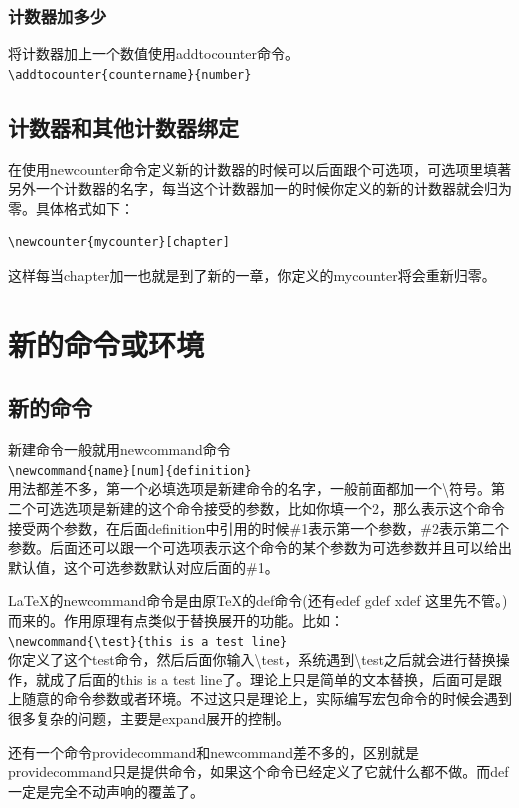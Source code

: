 \documentclass[12pt,oneside]{book}
\begin{document}
\begin{common-format}
\subsubsection{计数器加多少}
将计数器加上一个数值使用addtocounter命令。\\
\verb+\addtocounter{countername}{number}+

\subsection{计数器和其他计数器绑定}
在使用newcounter命令定义新的计数器的时候可以后面跟个可选项，可选项里填著另外一个计数器的名字，每当这个计数器加一的时候你定义的新的计数器就会归为零。具体格式如下：
\begin{Verbatim}
\newcounter{mycounter}[chapter]
\end{Verbatim}
这样每当chapter加一也就是到了新的一章，你定义的mycounter将会重新归零。





\section{新的命令或环境}
\subsection{新的命令}
新建命令一般就用newcommand命令\\
\verb+\newcommand{name}[num]{definition}+\\
用法都差不多，第一个必填选项是新建命令的名字，一般前面都加一个\textbackslash 符号。第二个可选选项是新建的这个命令接受的参数，比如你填一个2，那么表示这个命令接受两个参数，在后面definition中引用的时候\#{}1表示第一个参数，\#{}2表示第二个参数。后面还可以跟一个可选项表示这个命令的某个参数为可选参数并且可以给出默认值，这个可选参数默认对应后面的\#{}1。

\LaTeX 的newcommand命令是由原\TeX 的def命令(还有edef gdef xdef 这里先不管。)而来的。作用原理有点类似于替换展开的功能。比如：\\
\verb+\newcommand{\test}{this is a test line}+\\
你定义了这个test命令，然后后面你输入\textbackslash test，系统遇到\textbackslash test之后就会进行替换操作，就成了后面的this is a test line了。理论上只是简单的文本替换，后面可是跟上随意的命令参数或者环境。不过这只是理论上，实际编写宏包命令的时候会遇到很多复杂的问题，主要是expand展开的控制。

还有一个命令providecommand和newcommand差不多的，区别就是providecommand只是提供命令，如果这个命令已经定义了它就什么都不做。而def一定是完全不动声响的覆盖了。


\end{common-format}
\end{document}
